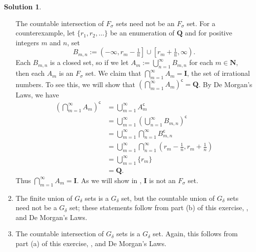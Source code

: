 \documentclass[12pt]{article}
\theoremstyle{definition}
\theoremstyle{exercise}
\theoremstyle{solution}
\newtheorem*{solution}{Solution}
\newcommand{\setcomp}[1]{#1^{\mathsf{c}}}
\newcommand{\N}{\mathbf{N}}
\newcommand{\Q}{\mathbf{Q}}
\newcommand{\I}{\mathbf{I}}
\begin{document}
\begin{solution}
\begin{enumerate}
        The countable intersection of \( F_{\sigma} \) sets need not be an \( F_{\sigma} \) set. For a counterexample, let \( \{ r_1, r_2, \ldots \} \) be an enumeration of \( \Q \) and for positive integers \( m \) and \( n \), set
        \[
            B_{m, n} := \left( -\infty, r_m - \tfrac{1}{n} \right] \cup \left[ r_m + \tfrac{1}{n}, \infty \right).
        \]
        Each \( B_{m, n} \) is a closed set, so if we let \( A_m := \bigcup_{n=1}^{\infty} B_{m, n} \) for each \( m \in \N \), then each \( A_m \) is an \( F_{\sigma} \) set. We claim that \( \bigcap_{m=1}^{\infty} A_m = \I \), the set of irrational numbers. To see this, we will show that \( \setcomp{(\bigcap_{m=1}^{\infty} A_m)} = \Q \). By De Morgan's Laws, we have
        \begin{align*}
            \textstyle \setcomp{\left( \bigcap_{m=1}^{\infty} A_m \right)} &= \textstyle \bigcup_{m=1}^{\infty} \setcomp{A_m} \\[2mm]
            &= \textstyle \bigcup_{m=1}^{\infty} \setcomp{\left( \bigcup_{n=1}^{\infty} B_{m, n} \right)} \\[2mm]
            &= \textstyle \bigcup_{m=1}^{\infty} \bigcap_{n=1}^{\infty} \setcomp{B_{m, n}} \\[2mm]
            &= \textstyle \bigcup_{m=1}^{\infty} \bigcap_{n=1}^{\infty} \left( r_m - \tfrac{1}{n}, r_m + \tfrac{1}{n} \right) \\[2mm]
            &= \textstyle \bigcup_{m=1}^{\infty} \{ r_m \} \\[2mm]
            &= \Q.
        \end{align*}
        Thus \( \bigcap_{m=1}^{\infty} A_m = \I \). As we will show in , \( \I \) is not an \( F_{\sigma} \) set.

        \item The finite union of \( G_{\delta} \) sets is a \( G_{\delta} \) set, but the countable union of \( G_{\delta} \) sets need not be a \( G_{\delta} \) set; these statements follow from part (b) of this exercise, , and De Morgan's Laws.

        \item The countable intersection of \( G_{\delta} \) sets is a \( G_{\delta} \) set. Again, this follows from part (a) of this exercise, , and De Morgan's Laws.
    \end{enumerate}
\end{solution}
\end{document}
